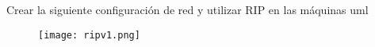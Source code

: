 Crear la siguiente configuración de red y utilizar RIP en las
máquinas uml

\begin{figure}[h]
  \texttt{[image: ripv1.png]}
  \centering
\end{figure}